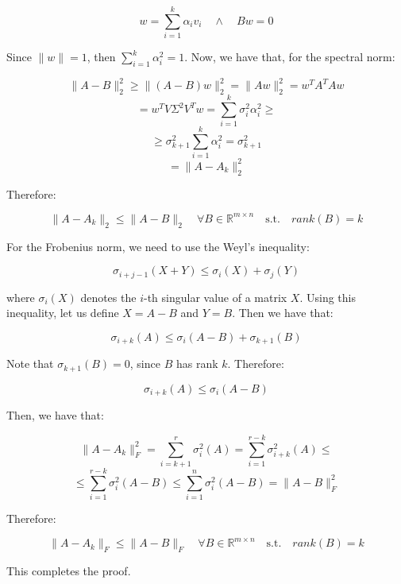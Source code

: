$$w = \sum_{i=1}^k \alpha_i v_i \quad \wedge \quad B w = 0$$

Since $\|w\| = 1$, then $\sum_{i=1}^k \alpha_i^2 = 1$. Now, we have that, for the 
spectral norm:

$$\|A - B\|_2^2 \geq \|(A - B) w\|_2^2 = \|A w\|_2^2 = w^T A^T A w$$
$$= w^T V \Sigma^2 V^T w = \sum_{i=1}^k \sigma_i^2 \alpha_i^2 \geq$$
$$\geq \sigma_{k+1}^2 \sum_{i=1}^k \alpha_i^2 = \sigma_{k+1}^2$$
$$= \|A - A_k\|_2^2$$

Therefore:

$$\|A - A_k\|_2 \leq \|A - B\|_2 \quad \forall B \in \mathbb{R}^{m \times n} \quad \text{s.t.} \quad rank(B) = k$$

For the Frobenius norm, we need to use the Weyl's inequality:

\begin{equation}
    \sigma_{i + j - 1}(X + Y) \leq \sigma_i(X) + \sigma_j(Y)
\end{equation}

where $\sigma_i(X)$ denotes the $i$-th singular value of a matrix $X$. Using this inequality, 
let us define $X = A - B$ and $Y = B$. Then we have that:

$$\sigma_{i + k}(A) \leq \sigma_i(A - B) + \sigma_{k + 1}(B)$$

Note that $\sigma_{k+1}(B) = 0$, since $B$ has rank $k$. Therefore:

$$\sigma_{i + k}(A) \leq \sigma_i(A - B)$$

Then, we have that:

$$\|A - A_k\|_F^2 = \sum_{i=k+1}^r \sigma_i^2(A) = \sum_{i=1}^{r - k} \sigma_{i+k}^2(A) \leq$$
$$\leq \sum_{i=1}^{r - k} \sigma_i^2(A - B) \leq \sum_{i=1}^n \sigma_i^2(A - B) = \|A - B\|_F^2$$

Therefore:

$$\|A - A_k\|_F \leq \|A - B\|_F \quad \forall B \in \mathbb{R}^{m \times n} \quad \text{s.t.} \quad rank(B) = k$$

This completes the proof.
